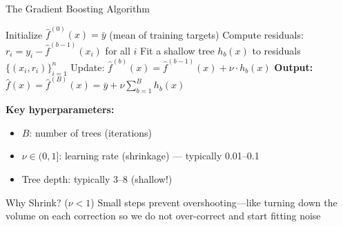\documentclass[10pt]{beamer}
\begin{document}
\begin{frame}{The Gradient Boosting Algorithm}

  \begin{algorithm}[H]
  \caption{Gradient Boosting for Regression}
  \begin{algorithmic}[1]
    \State Initialize $\widehat{f}^{(0)}(x) = \bar{y}$ (mean of training targets)
      \State Compute residuals: $r_i = y_i - \widehat{f}^{(b-1)}(x_i)$ for all $i$
      \State Fit a shallow tree $h_b(x)$ to residuals $\{(x_i, r_i)\}_{i=1}^n$
      \State Update: $\widehat{f}^{(b)}(x) = \widehat{f}^{(b-1)}(x) + \nu \cdot h_b(x)$
    \EndFor
    \State \textbf{Output:} $\widehat{f}(x) = \widehat{f}^{(B)}(x) = \bar{y} + \nu \sum_{b=1}^{B} h_b(x)$
  \end{algorithmic}
  \end{algorithm}

  \textbf{Key hyperparameters:}
  \begin{itemize}
    \item $B$: number of trees (iterations)
    \item $\nu \in (0,1]$: learning rate (shrinkage) --- typically 0.01--0.1
    \item Tree depth: typically 3--8 (shallow!)
  \end{itemize}

  \begin{block}{Why Shrink? ($\nu < 1$)}
    Small steps prevent overshooting---like turning down the volume on each correction so we do not over-correct and start fitting noise
  \end{block}
\end{frame}

\end{document}
